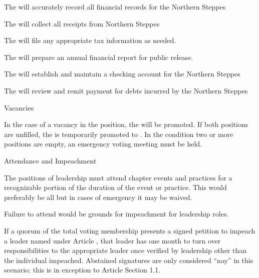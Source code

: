 \documentclass[12pt]{article}
\begin{document}
\begin{level}
\begin{level}
\begin{level}
            \item The  will accurately record all financial records for the Northern Steppes
            \item The  will collect all receipts from Northern Steppes
            \item The  will file any appropriate tax information as needed.
            \item The  will prepare an annual financial report for public release.
            \item The  will establish and maintain a checking account for the Northern Steppes
            \item The  will review and remit payment for debts incurred by the Northern Steppes
        \end{level}
    \end{level}

    \item Vacancies
    \begin{level} 
        \item In the case of a vacancy in the  position, the  will be promoted. If both positions are unfilled, the  is temporarily promoted to . In the condition two or more positions are empty, an emergency voting meeting must be held.
    \end{level}

    \item Attendance and Impeachment
    \begin{level} 
        \item The positions of leadership must attend chapter events and practices for a recognizable portion of the duration of the event or practice. This would preferably be all but in cases of emergency it may be waived.
        \item Failure to attend would be grounds for impeachment for leadership roles.
        \item If a quorum of the total voting membership presents a signed petition to impeach a leader named under Article , that leader has one month to turn over responsibilities to the appropriate leader once verified by leadership other than the individual impeached. Abstained signatures are only considered ``nay'' in this scenario; this is in exception to Article  Section 1.1.
    \end{level}


\end{level}
\end{document}
